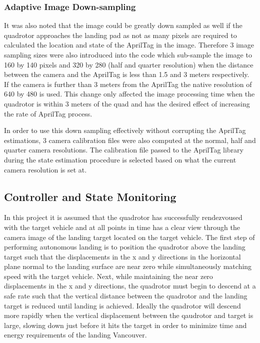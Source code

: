 \documentclass[11pt, twocolumn]{article}
\begin{document}
\subsubsection{Adaptive Image Down-sampling}
It was also noted that the image could be greatly down sampled as well if the quadrotor approaches the landing pad as not as many pixels are required to calculated the location and state of the AprilTag in the image. Therefore 3 image sampling sizes were also introduced into the code which sub-sample the image to 160 by 140 pixels and 320 by 280 (half and quarter resolution) when the distance between the camera and the AprilTag is less than 1.5 and 3 meters respectively. If the camera is further than 3 meters from the AprilTag the native resolution of 640 by 480 is used. This change only affected the image processing time when the quadrotor is within 3 meters of the quad and has the desired effect of increasing the rate of AprilTag process.

In order to use this down sampling effectively without corrupting the AprilTag estimations, 3 camera calibration files were also computed at the normal, half and quarter camera resolutions. The calibration file passed to the AprilTag library during the state estimation procedure is selected based on what the current camera resolution is set at. 

\subsection{Controller and State Monitoring}
In this project it is assumed that the quadrotor has successfully rendezvoused with the target vehicle and at all points in time has a clear view through the camera image of the landing target located on the target vehicle. The first step of performing  autonomous landing is to position the quadrotor above the landing target such that the displacements in the x and y directions in the horizontal plane normal to the landing surface are near zero while simultaneously matching speed with the target vehicle. Next, while maintaining the near zero displacements in the x and y directions, the quadrotor must begin to descend at a safe rate such that the vertical distance between the quadrotor and the landing target is reduced until landing is achieved. Ideally the quadrotor will descend more rapidly when the vertical displacement between the qaudrotor and target is large, slowing down just before it hits the target in order to minimize time and energy requirements of the landing Vancouver. 
\end{document}
